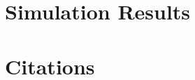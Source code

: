 \documentclass[times,authoryear]{elsarticle}
\begin{document}




\section{Simulation Results}




\section{Citations}
\end{document}
